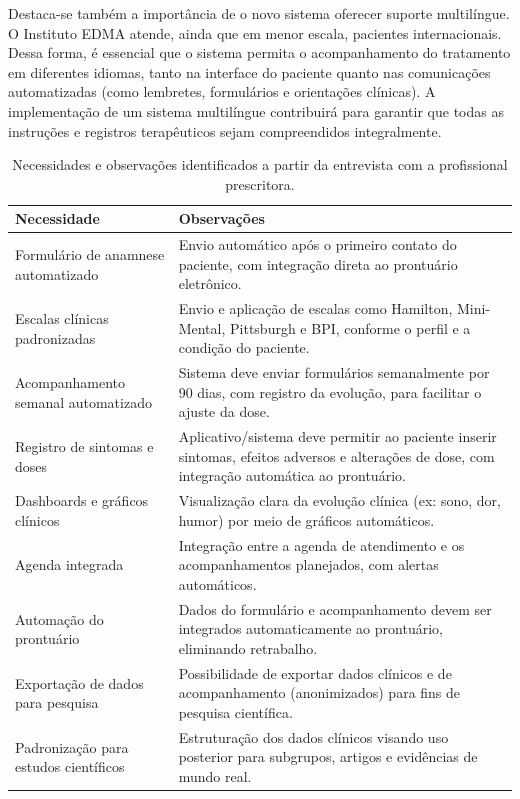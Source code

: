 \href{}{}\documentclass[12pt,portuguese,oneside]{article}
\begin{document}
Destaca-se também a importância de o novo sistema oferecer suporte multilíngue. O Instituto EDMA atende, ainda que em menor escala, pacientes internacionais. Dessa forma, é essencial que o sistema permita o acompanhamento do tratamento em diferentes idiomas, tanto na interface do paciente quanto nas comunicações automatizadas (como lembretes, formulários e orientações clínicas). A implementação de um sistema multilíngue contribuirá para garantir que todas as instruções e registros terapêuticos sejam compreendidos integralmente.

\begin{table}[H]
\centering
\caption{Necessidades e observações identificados a partir da entrevista com a profissional prescritora.}
\begin{tabularx}{\textwidth}{|>{\raggedright\arraybackslash}p{4.2cm}|>{\raggedright\arraybackslash}X|}
\hline
\rowcolor{gray!20}
\textbf{Necessidade} & \textbf{Observações} \\
\hline
Formulário de anamnese automatizado & Envio automático após o primeiro contato do paciente, com integração direta ao prontuário eletrônico. \\
\hline
Escalas clínicas padronizadas & Envio e aplicação de escalas como Hamilton, Mini-Mental, Pittsburgh e BPI, conforme o perfil e a condição do paciente. \\
\hline
Acompanhamento semanal automatizado & Sistema deve enviar formulários semanalmente por 90 dias, com registro da evolução, para facilitar o ajuste da dose. \\
\hline
Registro de sintomas e doses & Aplicativo/sistema deve permitir ao paciente inserir sintomas, efeitos adversos e alterações de dose, com integração automática ao prontuário. \\
\hline
Dashboards e gráficos clínicos & Visualização clara da evolução clínica (ex: sono, dor, humor) por meio de gráficos automáticos. \\
\hline
Agenda integrada & Integração entre a agenda de atendimento e os acompanhamentos planejados, com alertas automáticos. \\
\hline
Automação do prontuário & Dados do formulário e acompanhamento devem ser integrados automaticamente ao prontuário, eliminando retrabalho. \\
\hline
Exportação de dados para pesquisa & Possibilidade de exportar dados clínicos e de acompanhamento (anonimizados) para fins de pesquisa científica. \\
\hline
Padronização para estudos científicos & Estruturação dos dados clínicos visando uso posterior para subgrupos, artigos e evidências de mundo real. \\

\end{tabularx}
\end{table}
\end{document}
